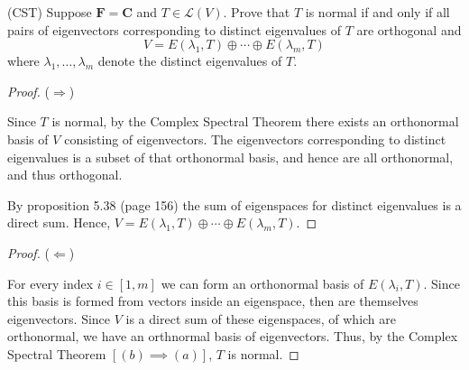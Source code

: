 (CST) Suppose $\mathbf{F} = \mathbf{C}$ and $T \in \mathcal{L}(V)$. Prove that $T$ is normal if and only if all pairs of eigenvectors corresponding to distinct eigenvalues of $T$ are orthogonal and
    \[
        V = E(\lambda_1,T) \oplus \cdots \oplus E(\lambda_m,T)
    \]
    where $\lambda_1 , \ldots , \lambda_m$ denote the distinct eigenvalues of $T$.

    \begin{proof} ($\Longrightarrow$)

        \nl Since $T$ is normal, by the Complex Spectral Theorem there exists an orthonormal basis of $V$ consisting of eigenvectors. The eigenvectors corresponding to distinct eigenvalues is a subset of that orthonormal basis, and hence are all orthonormal, and thus orthogonal.
        
        \nl By proposition 5.38 (page 156) the sum of eigenspaces for distinct eigenvalues is a direct sum. Hence, $V =  E(\lambda_1,T) \oplus \cdots \oplus E(\lambda_m,T)$.

    \end{proof}
\vspace{.5in}
    \begin{proof} ($\Longleftarrow$)

        \nl For every index $i \in [1,m]$ we can form an orthonormal basis of $E(\lambda_i,T)$. Since this basis is formed from vectors inside an eigenspace, then are themselves eigenvectors. Since $V$ is a direct sum of these eigenspaces, of which are orthonormal, we have an orthnormal basis of eigenvectors. Thus, by the Complex Spectral Theorem $[(b) \implies (a)]$, $T$ is normal.

    \end{proof}